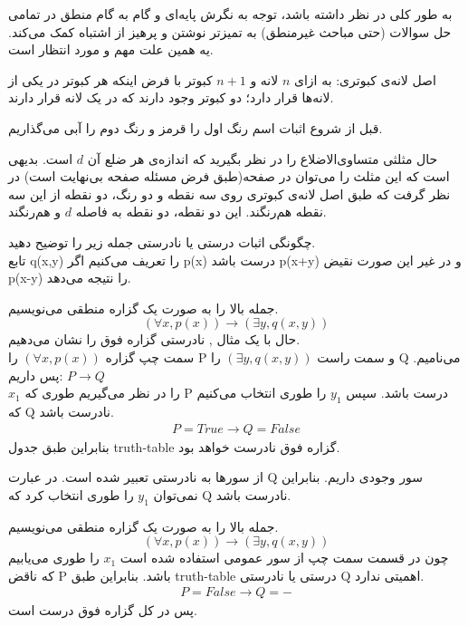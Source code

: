 \documentclass[11pt,largemargins]{h2wp}
\begin{document}
به‌ طور کلی در نظر داشته باشد، توجه به نگرش پایه‌ای و گام به گام منطق در تمامی حل سوالات (حتی مباحث غیرمنطق) به تمیزتر نوشتن و پرهیز از اشتباه کمک می‌کند. یه همین علت مهم و مورد انتظار است.\\

 
    اصل لانه‌ی کبوتری: به ازای 
    $n$
    لانه و 
    $n+1$
    کبوتر با فرض اینکه هر کبوتر در یکی از لانه‌ها قرار دارد؛ دو کبوتر وجود دارند که در یک لانه قرار دارند.

    قبل از شروع اثبات اسم رنگ اول را قرمز و رنگ دوم را آبی می‌گذاریم.

    حال مثلثی متساوی‌الاضلاع را در نظر بگیرید که اندازه‌ی هر ضلع آن
    $d$
    است. بدیهی است که این مثلث را می‌توان در صفحه‌(طبق فرض مسئله صفحه بی‌نهایت است)
    در نظر گرفت که طبق اصل لانه‌ی کبوتری روی سه نقطه و دو رنگ، دو نقطه از این سه نقطه هم‌ر‌‌نگند.
    این دو نقطه،
    دو نقطه به فاصله
    $d$
    و هم‌رنگند.
    
 \notes
 
    
  \question

چگونگی اثبات درستی یا نادرستی جمله زیر را توضیح دهید.\\
 تابع q(x,y) را تعریف می‌کنیم اگر p(x) درست باشد p(x+y) و در غیر این صورت نقیض p(x-y) را نتیجه می‌دهد. 
  
 
 
 \solution
 
 جمله بالا را به صورت یک گزاره منطقی می‌نویسیم.
  $$  (\forall x,p(x)) \rightarrow (\exists y, q(x,y)) $$
  حال با یک مثال , نادرستی گزاره فوق را نشان می‌دهیم.\\
 سمت چپ گزاره 
 $(\forall x,p(x))$
 را P
و سمت راست 
$ (\exists y, q(x,y)) $
را Q می‌نامیم.
پس داریم:
$ P \rightarrow Q $
\\
$x_1$
را در نظر می‌گیریم طوری که P درست باشد.
 سپس 
$ y_1 $
را طوری انتخاب می‌کنیم که Q نادرست باشد.
\begin{align*}
 P=True \rightarrow Q=False
\end{align*}
بنابراین طبق جدول truth-table
گزاره فوق نادرست خواهد بود.\\


 \notes
 
 از سورها به نادرستی تعبیر شده است. در عبارت Q سور وجودی داریم. بنابراین نمی‌توان $ y_1 $
را طوری انتخاب کرد که Q نادرست باشد.
 

 
 جمله بالا را به صورت یک گزاره منطقی می‌نویسیم.
  $$  (\forall x,p(x)) \rightarrow (\exists y, q(x,y)) $$
چون در قسمت سمت چپ از سور عمومی استفاده شده است 
$ x_1 $
را طوری می‌یابیم که ناقض P باشد. بنابراین طبق truth-table درستی یا نادرستی Q اهمیتی ندارد.
\begin{align*}
 P=False \rightarrow Q= -
\end{align*}
پس در کل گزاره فوق درست است.

 
\end{document}
